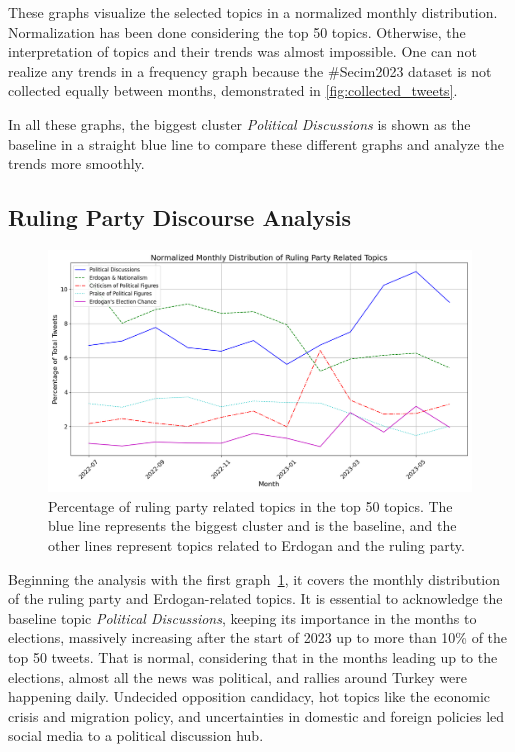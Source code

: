 These graphs visualize the selected topics in a normalized monthly distribution. 
Normalization has been done considering the top 50 topics. Otherwise, the interpretation of topics 
and their trends was almost impossible. One can not realize any trends in a frequency graph because 
the \#Secim2023 dataset is not collected equally between months, demonstrated in \autoref{fig:collected_tweets}.

In all these graphs, the biggest cluster \textit{Political Discussions} is shown as the baseline 
in a straight blue line to compare these different graphs and analyze the trends more smoothly. 

\subsection{Ruling Party Discourse Analysis}

\begin{figure}[htb]
    \centering
    \includegraphics[width=\linewidth]{figures/normalized_akp_selected_topics_distribution_with_styles.png}
    \caption[Normalized monthly distribution of ruling party related topics]
    {Percentage of ruling party related topics in the top 50 topics. 
    The blue line represents the biggest cluster and is the baseline, 
    and the other lines represent topics related to Erdogan and the ruling party.}\label{fig:topics_graph_akp}
\end{figure}

Beginning the analysis with the first graph~\ref{fig:topics_graph_akp}, 
it covers the monthly distribution of the ruling party and Erdogan-related topics. 
It is essential to acknowledge the baseline topic \textit{Political Discussions}, 
keeping its importance in the months to elections, massively increasing after the start of 2023 up 
to more than 10\% of the top 50 tweets. That is normal, considering that in the months leading up 
to the elections, almost all the news was political, and rallies around Turkey were happening daily. 
Undecided opposition candidacy, hot topics like the economic crisis and migration policy, and 
uncertainties in domestic and foreign policies led social media to a political discussion hub.

